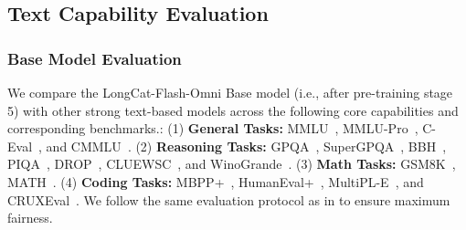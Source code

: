 \documentclass{article}
\begin{document}



\subsection{Text Capability Evaluation}
\subsubsection{Base Model Evaluation}
We compare the LongCat-Flash-Omni Base model (i.e., after pre-training stage 5) with other strong text-based models across the following core capabilities and corresponding benchmarks.: (1) \textbf{General Tasks:} MMLU~\citep{hendrycks2021measuringmassivemultitasklanguage}, MMLU-Pro~\citep{wang2024mmluprorobustchallengingmultitask}, C-Eval~\citep{huang2023ceval}, and CMMLU~\citep{li2023cmmlu}. (2) \textbf{Reasoning Tasks:} GPQA~\citep{rein2023gpqagraduatelevelgoogleproofqa}, SuperGPQA~\citep{pteam2025supergpqascalingllmevaluation}, BBH~\citep{BBH}, PIQA~\citep{piqa}, DROP~\citep{drop}, CLUEWSC~\citep{clue}, and WinoGrande~\citep{winogrande}. (3) \textbf{Math Tasks:} GSM8K~\citep{cobbe2021gsm8k}, MATH~\citep{mathbenchmark}. (4) \textbf{Coding Tasks:} MBPP+~\citep{humanevalmbppplus}, HumanEval+~\citep{humanevalmbppplus}, MultiPL-E~\citep{cassano2022multiplescalableextensibleapproach}, and CRUXEval~\citep{gu2024cruxevalbenchmarkcodereasoning}. We follow the same evaluation protocol as in \citep{meituan2025longcat_flash_chat} to ensure maximum fairness.
\end{document}
